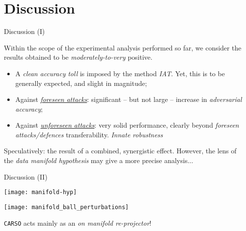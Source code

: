 
\section{ Discussion}{

    \begin{frame}{ Discussion (I)}

        Within the scope of the experimental analysis performed so far, we consider the results obtained to be \textit{moderately-to-very} \alert{positive}.

        \begin{itemize}
            \item A \textit{clean accuracy \alert{toll}} is imposed by the method \wrt \textit{IAT}. Yet, this is to be generally expected, and slight in magnitude;
            \item Against \underline{\textit{foreseen attacks}}: significant -- but not large -- increase in \textit{adversarial accuracy};
            \item Against \underline{\textit{unforeseen attacks}}: very solid performance, clearly beyond \textit{foreseen attacks/defences} transferability. \textit{Innate robustness}
        \end{itemize}

    Speculatively: the result of a combined, synergistic effect. However, the lens of the \textit{data manifold hypothesis} may give a more precise analysis...

    \end{frame}

    \begin{frame}{ Discussion (II)}

    \begin{minipage}[c]{0.49\textwidth}
        \texttt{[image: manifold-hyp]}
    \end{minipage}
    \begin{minipage}[c]{0.49\textwidth}
        \vspace{0pt}
        \texttt{[image: manifold\_ball\_perturbations]}
    \end{minipage}
    \hfill\break

    \texttt{CARSO} acts mainly as an \textit{on manifold re-projector}!


\end{frame}}

